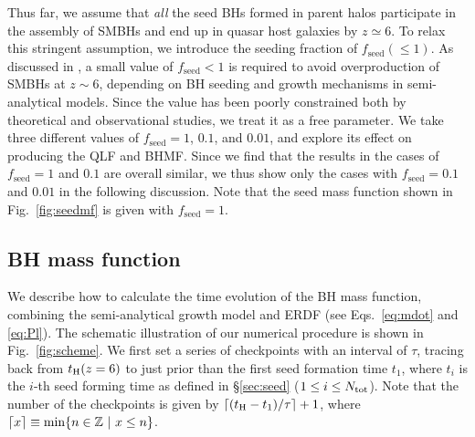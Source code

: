 \documentclass[twocolumn, twocolappendix]{aastex63}
\newcommand{\tlife}{\tau}
\newcommand{\fseed}{f_\mathrm{seed}}
\begin{document}
\begin{CJK*}{UTF8}{gbsn}
Thus far, we assume that {\it all} the seed BHs formed in parent halos participate in the assembly of SMBHs and 
end up in quasar host galaxies by $z\simeq 6$.
To relax this stringent assumption, we introduce the seeding fraction of $\fseed (\leq 1)$.
As discussed in \citet{2009ApJ...696.1798T}, a small value of $\fseed <1$ is required to avoid overproduction of SMBHs at $z\sim 6$,
depending on BH seeding and growth mechanisms in semi-analytical models.
Since the value has been poorly constrained both by theoretical and observational studies, we treat it as a free parameter.
We take three different values of $\fseed = 1$, $0.1$, and $0.01$, and explore its effect on producing the QLF and BHMF.
Since we find that the results in the cases of $\fseed = 1$ and $0.1$ are overall similar,
we thus show only the cases with $\fseed=0.1$ and $0.01$ in the following discussion.
Note that the seed mass function shown in Fig.~\ref{fig:seedmf} is given with $\fseed = 1$.



\subsection{BH mass function}\label{sec:MF}

We describe how to calculate the time evolution of the BH mass function, 
combining the semi-analytical growth model and ERDF (see Eqs.~\ref{eq:mdot} and \ref{eq:Pl}).
The schematic illustration of our numerical procedure is shown in Fig.~\ref{fig:scheme}. 
We first set a series of checkpoints with an interval of $\tlife$, 
tracing back from $t_{\rm H}(z=6)$ to just prior than the first seed formation time $t_1$, where $t_i$ is the $i$-th seed forming time
as defined in \S\ref{sec:seed} ($1\leq i\leq N_{\rm tot}$).
Note that the number of the checkpoints is given by $\lceil (t_{\rm H}-t_1)/\tau \rceil+1$, where $\lceil x\rceil \equiv {\rm min}\{n \in \mathbb{Z}~ |~x\leq n\}$.



\end{CJK*}
\end{document}
